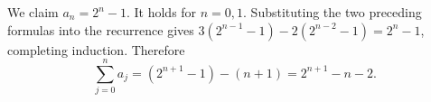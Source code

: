 We claim $a_n=2^n-1$. It holds for $n=0,1$. Substituting the two preceding formulas into the recurrence gives $3(2^{n-1}-1)-2(2^{n-2}-1)=2^n-1$, completing induction. Therefore
\[\sum_{j=0}^na_j=(2^{n+1}-1)-(n+1)=\boxed{2^{n+1}-n-2}.\]
